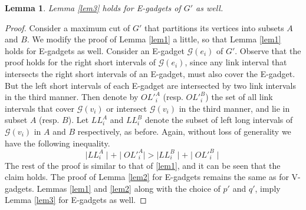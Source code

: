 \documentclass[11pt]{article}
\newtheorem{lemma}{Lemma}
\begin{document}
\begin{lemma} \label{lem5}
 Lemma \ref{lem3} holds for E-gadgets of $G'$ as well.
\end{lemma}

\begin{proof}

Consider a maximum cut of $G'$ that partitions its vertices into subsets $A$ and $B$. We modify the proof of Lemma \ref{lem1} a little, so that Lemma \ref{lem1} holds for E-gadgets as well. Consider an E-gadget $\mathcal{G}(e_i)$ of $G'$. Observe that the proof holds for the right short intervals of $\mathcal{G}(e_i)$, since any link interval that intersects the right short intervals of an E-gadget, must also cover the E-gadget. But the left short intervals of each E-gadget are intersected by two link intervals in the third manner. Then denote by $OL'^A_i$ (resp. $OL'^B_i$) the set of all link intervals that cover $\mathcal{G}(v_i)$ or intersect $\mathcal{G}(v_i)$ in the third manner, and lie in subset $A$ (resp. $B$). Let $LL^A_i$ and $LL^B_i$ denote the subset of left long intervals of $\mathcal{G}(v_i)$ in $A$ and $B$ respectively, as before. Again, without loss of generality we have the following inequality.
 $$\mid LL^A_i \mid + \mid OL'^A_i \mid > \mid LL^B_i \mid + \mid OL'^B_i \mid$$
 The rest of the proof is similar to that of \ref{lem1}, and it can be seen that the claim holds. The proof of Lemma \ref{lem2} for E-gadgets remains the same as for V-gadgets. Lemmas \ref{lem1} and \ref{lem2} along with the choice of $p'$ and $q'$, imply Lemma \ref{lem3} for E-gadgets as well. 
\end{proof}

% 
% 
% 
% 
% 
% 
% 
% 
% 
\end{document}
